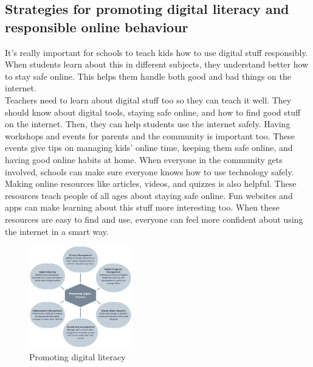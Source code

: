 \documentclass[a4paper, 10 pt, conference]{ieeeconf}  %
\begin{document}
\subsection{Strategies for promoting digital literacy and responsible online behaviour}
It’s really important for schools to teach kids how to use digital stuff responsibly. When students learn about this in different subjects, they understand better how to stay safe online. This helps them handle both good and bad things on the internet.
\\ Teachers need to learn about digital stuff too so they can teach it well. They should know about digital tools, staying safe online, and how to find good stuff on the internet. Then, they can help students use the internet safely. Having workshops and events for parents and the community is important too. These events give tips on managing kids’ online time, keeping them safe online, and having good online habits at home. When everyone in the community gets involved, schools can make sure everyone knows how to use technology safely.
\\ Making online resources like articles, videos, and quizzes is also helpful. These resources teach people of all ages about staying safe online. Fun websites and apps can make learning about this stuff more interesting too. When these resources are easy to find and use, everyone can feel more confident about using the internet in a smart way.
\begin{figure}[h]
    \centering
    \includegraphics[width=0.4\textwidth]{2.png}
    \caption{Promoting digital literacy}
    \label{fig:example}
\end{figure}
\end{document}
